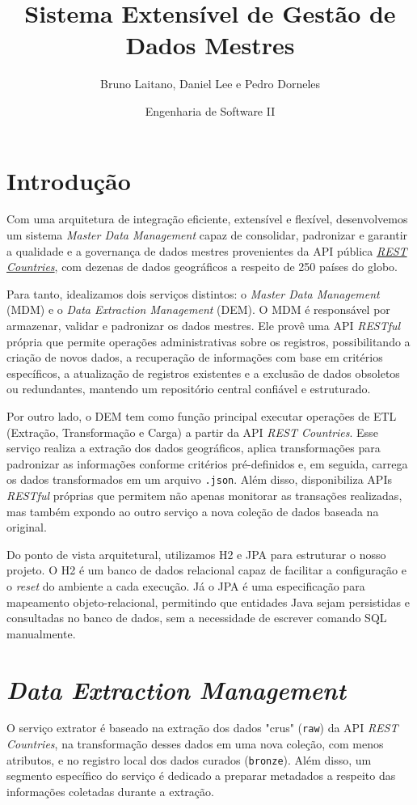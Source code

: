 \documentclass[12pt]{article}
\title{\textbf{Sistema Extensível de Gestão de Dados Mestres}}
\date{Engenharia de Software II}
\author{Bruno Laitano, Daniel Lee e Pedro Dorneles}
\begin{document}
\maketitle

\section{Introdução}
Com uma arquitetura de integração eficiente, extensível e flexível, desenvolvemos um sistema \emph{Master Data Management} capaz de consolidar, padronizar e garantir a qualidade e a governança de dados mestres provenientes da API pública \href{https://restcountries.com/v3.1/all}{\emph{REST Countries}}, com dezenas de dados geográficos a respeito de 250 países do globo.

\quad Para tanto, idealizamos dois serviços distintos: o \emph{Master Data Management} (MDM) e o \emph{Data Extraction Management} (DEM). O MDM é responsável por armazenar, validar e padronizar os dados mestres. Ele provê uma API \emph{RESTful} própria que permite operações administrativas sobre os registros, possibilitando a criação de novos dados, a recuperação de informações com base em critérios específicos, a atualização de registros existentes e a exclusão de dados obsoletos ou redundantes, mantendo um repositório central confiável e estruturado.

\quad Por outro lado, o DEM tem como função principal executar operações de ETL (Extração, Transformação e Carga) a partir da API \emph{REST Countries}. Esse serviço realiza a extração dos dados geográficos, aplica transformações para padronizar as informações conforme critérios pré-definidos e, em seguida, carrega os dados transformados em um arquivo \texttt{.json}. Além disso, disponibiliza APIs \emph{RESTful} próprias que permitem não apenas monitorar as transações realizadas, mas também expondo ao outro serviço a nova coleção de dados baseada na original.

\quad Do ponto de vista arquitetural, utilizamos H2 e JPA para estruturar o nosso projeto. O H2 é um banco de dados relacional capaz de facilitar a configuração e o \emph{reset} do ambiente a cada execução. Já o JPA é uma especificação para mapeamento objeto-relacional, permitindo que entidades Java sejam persistidas e consultadas no banco de dados, sem a necessidade de escrever comando SQL manualmente.

\section{\emph{Data Extraction Management}}
O serviço extrator é baseado na extração dos dados "crus" (\texttt{raw}) da API \emph{REST Countries}, na transformação desses dados em uma nova coleção, com menos atributos, e no registro local dos dados curados (\texttt{bronze}). Além disso, um segmento específico do serviço é dedicado a preparar metadados a respeito das informações coletadas durante a extração.
\end{document}
